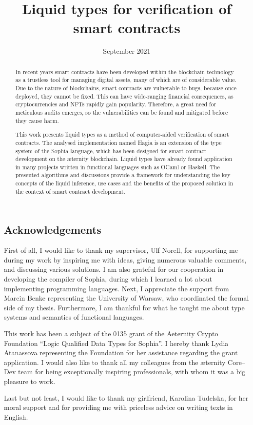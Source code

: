 \documentclass[en]{pracamgr}
\title{Liquid types for verification of smart contracts}
\date{September 2021}
\begin{document}
\maketitle

\center \subsection*{Acknowledgements}

\justify First of all, I would like to thank my supervisor, Ulf Norell, for
supporting me during my work by inspiring me with ideas, giving numerous
valuable comments, and discussing various solutions. I am also grateful for our
cooperation in developing the compiler of Sophia, during which I learned a lot
about implementing programming languages. Next, I appreciate the support from
Marcin Benke representing the University of Warsaw, who coordinated the formal
side of my thesis. Furthermore, I am thankful for what he taught me about type
systems and semantics of functional languages.

\justify This work has been a subject of the 0135 grant of the Aeternity Crypto
Foundation ``Logic Qualified Data Types for Sophia''. I hereby thank Lydia
Atanassova representing the Foundation for her assistance regarding the grant
application. I would also like to thank all my colleagues from the {\ae}ternity
Core--Dev team for being exceptionally inspiring professionals, with whom it was
a big pleasure to work.

\justify Last but not least, I would like to thank my girlfriend, Karolina
Tudelska, for her moral support and for providing me with priceless advice on
writing texts in English.

\begin{abstract}
  In recent years smart contracts have been developed within the blockchain
  technology as a trustless tool for managing digital assets, many of which are
  of considerable value. Due to the nature of blockchains, smart contracts are
  vulnerable to bugs, because once deployed, they cannot be fixed. This can have
  wide-ranging financial consequences, as cryptocurrencies and NFTs rapidly gain
  popularity. Therefore, a great need for meticulous audits emerges, so the
  vulnerabilities can be found and mitigated before they cause harm.

  This work presents liquid types as a method of computer-aided verification of
  smart contracts. The analysed implementation named Hagia is an extension of
  the type system of the Sophia language, which has been designed for smart
  contract development on the {\ae}ternity blockchain. Liquid types have already
  found application in many projects written in functional languages such as
  OCaml or Haskell. The presented algorithms and discussions provide a framework
  for understanding the key concepts of the liquid inference, use cases and the
  benefits of the proposed solution in the context of smart contract
  development.
\end{abstract}
\end{document}
